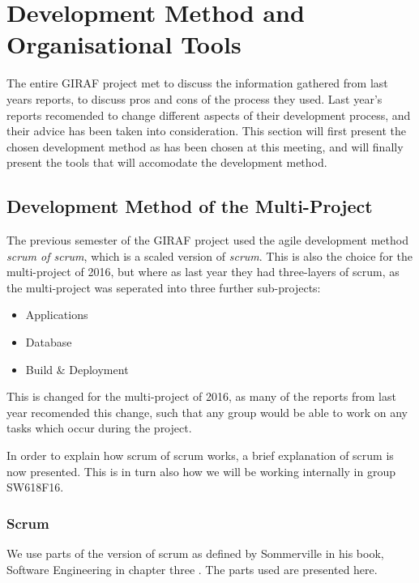 \section{Development Method and Organisational Tools}
The entire GIRAF project met to discuss the information gathered from last years reports, to discuss pros and cons of the process they used.
Last year's reports recomended to change different aspects of their development process, and their advice has been taken into consideration.
This section will first present the chosen development method as has been chosen at this meeting, and will finally present the tools that will accomodate the development method.


\subsection*{Development Method of the Multi-Project}
The previous semester of the GIRAF project used the agile development method \textit{scrum of scrum}, which is a scaled version of \textit{scrum}.
This is also the choice for the multi-project of 2016, but where as last year they had three-layers of scrum, as the multi-project was seperated into three further sub-projects:
\begin{itemize}
	\item Applications
	\item Database
	\item Build \& Deployment
\end{itemize}

This is changed for the multi-project of 2016, as many of the reports from last year recomended this change, such that any group would be able to work on any tasks which occur during the project.

In order to explain how scrum of scrum works, a brief explanation of scrum is now presented.
This is in turn also how we will be working internally in group SW618F16. 


\subsubsection*{Scrum}

We use parts of the version of scrum as defined by Sommerville in his book, Software Engineering in chapter three \cite{SEBOOK}.
The parts used are presented here.

